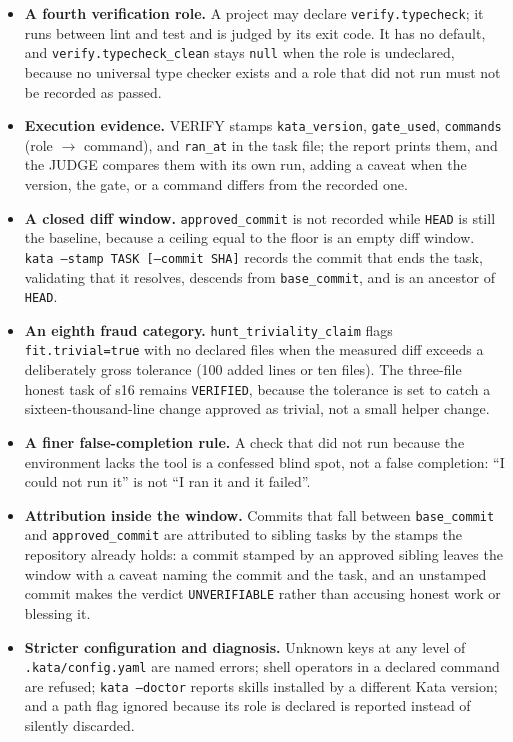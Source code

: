 \documentclass{sbc2019}%
\begin{document}
\begin{itemize}
\item \textbf{A fourth verification role.} A project may declare
  \texttt{verify.typecheck}; it runs between lint and test and is judged by
  its exit code. It has no default, and \texttt{verify.typecheck\_clean}
  stays \texttt{null} when the role is undeclared, because no universal type
  checker exists and a role that did not run must not be recorded as passed.
\item \textbf{Execution evidence.} VERIFY stamps \texttt{kata\_version},
  \texttt{gate\_used}, \texttt{commands} (role $\rightarrow$ command), and
  \texttt{ran\_at} in the task file; the report prints them, and the JUDGE
  compares them with its own run, adding a caveat when the version, the gate,
  or a command differs from the recorded one.
\item \textbf{A closed diff window.} \texttt{approved\_commit} is not
  recorded while \texttt{HEAD} is still the baseline, because a ceiling equal
  to the floor is an empty diff window. \texttt{kata --stamp TASK
  [--commit SHA]} records the commit that ends the task, validating that it
  resolves, descends from \texttt{base\_commit}, and is an ancestor of
  \texttt{HEAD}.
\item \textbf{An eighth fraud category.} \texttt{hunt\_triviality\_claim}
  flags \texttt{fit.trivial=true} with no declared files when the measured
  diff exceeds a deliberately gross tolerance (100 added lines or ten files).
  The three-file honest task of s16 remains \texttt{VERIFIED}, because the
  tolerance is set to catch a sixteen-thousand-line change approved as
  trivial, not a small helper change.
\item \textbf{A finer false-completion rule.} A check that did not run
  because the environment lacks the tool is a confessed blind spot, not a
  false completion: ``I could not run it'' is not ``I ran it and it failed''.
\item \textbf{Attribution inside the window.} Commits that fall between
  \texttt{base\_commit} and \texttt{approved\_commit} are attributed to
  sibling tasks by the stamps the repository already holds: a commit stamped
  by an approved sibling leaves the window with a caveat naming the commit
  and the task, and an unstamped commit makes the verdict
  \texttt{UNVERIFIABLE} rather than accusing honest work or blessing it.
\item \textbf{Stricter configuration and diagnosis.} Unknown keys at any
  level of \texttt{.kata/config.yaml} are named errors; shell operators in a
  declared command are refused; \texttt{kata --doctor} reports skills
  installed by a different Kata version; and a path flag ignored because its
  role is declared is reported instead of silently discarded.
\end{itemize}
\end{document}
